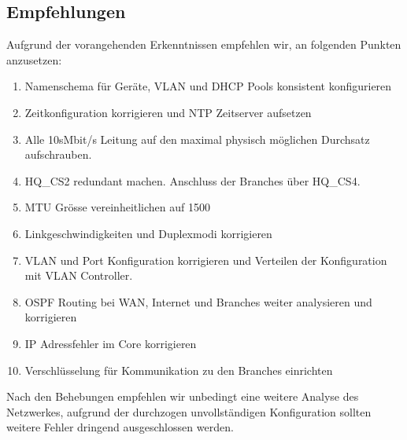 \subsection{Empfehlungen}
\label{sec:recommedations}
Aufgrund der vorangehenden Erkenntnissen empfehlen wir, an folgenden Punkten anzusetzen:
\begin{enumerate}
	\item Namenschema für Geräte, VLAN und DHCP Pools konsistent konfigurieren
	\item Zeitkonfiguration korrigieren und NTP Zeitserver aufsetzen
	\item Alle 10sMbit/s Leitung auf den maximal physisch möglichen Durchsatz aufschrauben. 
	\item HQ\_CS2 redundant machen. Anschluss der Branches über HQ\_CS4.
	\item MTU Grösse vereinheitlichen auf 1500
	\item Linkgeschwindigkeiten und Duplexmodi korrigieren 
	\item VLAN und Port Konfiguration korrigieren und Verteilen der Konfiguration mit VLAN Controller.
	\item OSPF Routing bei WAN, Internet und Branches weiter analysieren und korrigieren
	\item IP Adressfehler im Core korrigieren
	\item Verschlüsselung für Kommunikation zu den Branches einrichten
\end{enumerate}
Nach den Behebungen empfehlen wir unbedingt eine weitere Analyse des Netzwerkes, aufgrund der durchzogen unvollständigen Konfiguration sollten weitere Fehler dringend ausgeschlossen werden.

